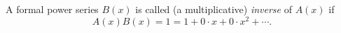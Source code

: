 

\setcounter{section}{2}
\setcounter{subsection}{2}
\setcounter{dfn}{1}

\begin{dfn}
A formal power series $B(x)$ is called (a multiplicative) \emph{inverse} of $A(x)$ if
\[
A(x)B(x) = 1 = 1 + 0 \cdot x + 0 \cdot x^2 + \cdots.
\]
\end{dfn}


